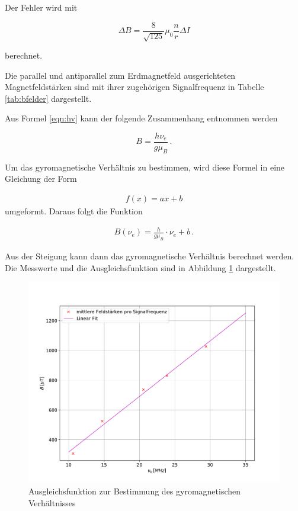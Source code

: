 Der Fehler wird mit

\begin{equation}
  \Delta{B} = \frac{8}{\sqrt{125}} \mu_0 \frac{n}{r} \Delta{I}
\end{equation}

berechnet.

Die parallel und antiparallel zum Erdmagnetfeld ausgerichteten Magnetfeldstärken
sind mit ihrer zugehörigen Signalfrequenz in Tabelle \ref{tab:bfelder} dargestellt.



Aus Formel \eqref{eqn:hv}
kann der folgende Zusammenhang entnommen werden

\begin{equation}
  B = \frac{h \nu_e}{g \mu_B} \, .
\end{equation}

Um das gyromagnetische Verhältnis zu bestimmen, wird diese Formel in eine
Gleichung der Form

\begin{align*}
  f(x) = ax + b
\end{align*}
umgeformt. Daraus folgt die Funktion

\begin{align*}
  B(\nu_e) = \frac{h}{g \mu_B} \cdot \nu_e + b \, .
\end{align*}

Aus der Steigung kann dann das gyromagnetische Verhältnis berechnet werden.
Die Messwerte und die Ausgleichsfunktion sind in Abbildung \ref{fig:plot}
dargestellt.

\begin{figure}[H]
  \centering
  \includegraphics[width=\textwidth]{plot.pdf}
  \caption{Ausgleichsfunktion zur Bestimmung des gyromagnetischen Verhältnisses}
  \label{fig:plot}
\end{figure}

